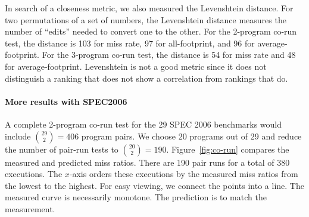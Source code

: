 In search of a closeness metric, we also measured the Levenshtein
distance.  For two permutations of a set of numbers, the Levenshtein
distance measures the number of ``edits'' needed to convert one to the
other.  For the 2-program co-run test, the distance is 103 for miss
rate, 97 for all-footprint, and 96 for average-footprint.  For the
3-program co-run test, the distance is 54 for miss rate and 48 for
average-footprint. Levenshtein is not a good metric since it does not
distinguish a ranking that does not show a correlation from rankings
that do. 


\paragraph{More results with SPEC2006}
\label{sec:pair}

A complete 2-program co-run test for the 29 SPEC 2006 benchmarks would
include ${29 \choose 2} = 406$ program pairs. We choose 20 programs
out of 29 and reduce the number of pair-run tests to ${20 \choose 2} =
190$. Figure~\ref{fig:co-run} compares the measured and predicted miss
ratios. There are 190 pair runs for a total of 380 executions.  
The $x$-axis orders these executions by the measured miss ratios 
from the lowest to the highest.  For easy viewing, we connect the
points into a line. The measured curve is necessarily monotone.  The
prediction is to match the measurement.

